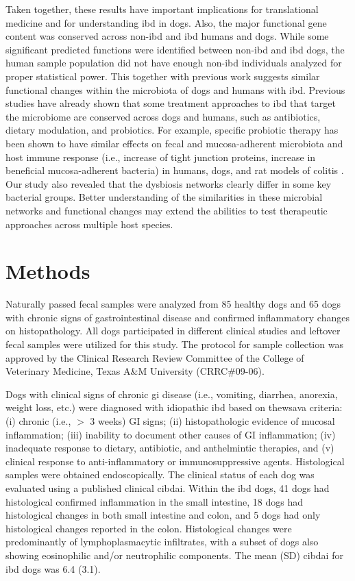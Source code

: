 Taken together, these results have important implications for translational medicine and for understanding \gls{ibd} in dogs. Also, the major functional gene content was conserved across non-\gls{ibd} and \gls{ibd} humans and dogs. While some significant predicted functions were identified between non-\gls{ibd} and \gls{ibd} dogs, the human sample population did not have enough non-\gls{ibd} individuals analyzed for proper statistical power. This together with previous work suggests similar functional changes within the microbiota of dogs and humans with \gls{ibd}. Previous studies have already shown that some treatment approaches to \gls{ibd} that target the microbiome are conserved across dogs and humans, such as antibiotics, dietary modulation, and probiotics. For example, specific probiotic therapy has been shown to have similar effects on fecal and mucosa-adherent microbiota and host immune response (i.e., increase of tight junction proteins, increase in beneficial mucosa-adherent bacteria) in humans, dogs, and rat models of colitis \cite{RN17583, RN17357, RN158}. 
Our study also revealed that the dysbiosis networks clearly differ in some key bacterial groups. Better understanding of the similarities in these microbial networks and functional changes may extend the abilities to test therapeutic approaches across multiple host species.

\section{Methods}

Naturally passed fecal samples were analyzed from 85 healthy dogs and 65 dogs with chronic signs of gastrointestinal disease and confirmed inflammatory changes on histopathology. All dogs participated in different clinical studies and leftover fecal samples were utilized for this study. The protocol for sample collection was approved by the Clinical Research Review Committee of the College of Veterinary Medicine, Texas A\&M University (CRRC\#09-06). 

Dogs with clinical signs of chronic \gls{gi} disease (i.e., vomiting, diarrhea, anorexia, weight loss, etc.) were diagnosed with idiopathic \gls{ibd} based on the\gls{wsava} criteria: (i) chronic (i.e., $>$ 3 weeks) GI signs; (ii) histopathologic evidence of mucosal inflammation; (iii) inability to document other causes of GI inflammation; (iv) inadequate response to dietary, antibiotic, and anthelmintic therapies, and (v) clinical response to anti-inflammatory or immunosuppressive agents.  Histological samples were obtained endoscopically. The clinical status of each dog was evaluated using a published clinical \gls{cibdai}. Within the \gls{ibd} dogs, 41 dogs had histological confirmed inflammation in the small intestine, 18 dogs had histological changes in both small intestine and colon, and 5 dogs had only histological changes reported in the colon. Histological changes were predominantly of lymphoplasmacytic infiltrates, with a subset of dogs also showing eosinophilic and/or neutrophilic components. The mean (SD) \gls{cibdai} for \gls{ibd} dogs was 6.4 (3.1).

